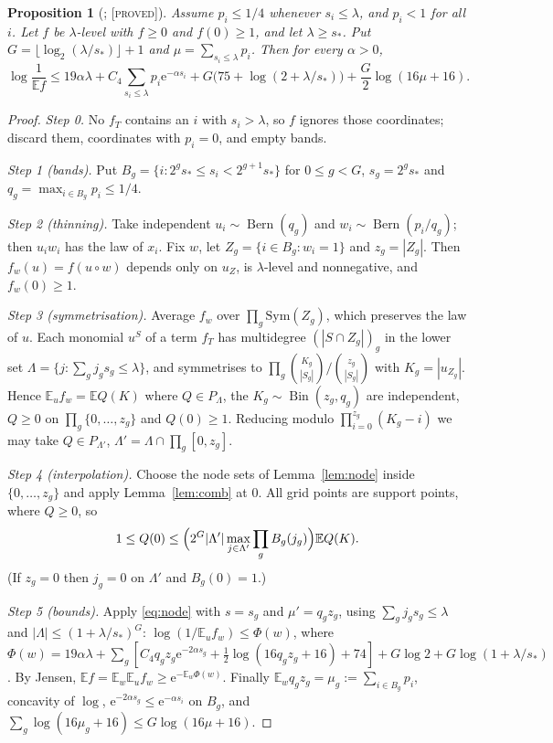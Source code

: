 \documentclass[10pt,reqno]{amsart}
\newtheorem{proposition}[theorem]{Proposition}
\theoremstyle{definition}
\theoremstyle{remark}
\newcommand{\E}{\mathbb E}
\newcommand{\Bin}{\operatorname{Bin}}
\newcommand{\Bern}{\operatorname{Bern}}
\newcommand{\e}{\mathrm e}
\newcommand{\lab}[1]{\textup{[\textsc{#1}]}}
\begin{document}
\begin{proposition}[{\cite[Prop.~2.4]{ET}}; \lab{proved}]\label{prop:boolean}
Assume $p_i\leq1/4$ whenever $s_i\leq\lambda$, and $p_i<1$ for all $i$.  Let
$f$ be $\lambda$-level with $f\geq0$ and $f(0)\geq1$, and let
$\lambda\geq s_*$.  Put $G=\lfloor\log_2(\lambda/s_*)\rfloor+1$ and
$\mu=\sum_{s_i\leq\lambda}p_i$.  Then for every $\alpha>0$,
\begin{equation}\label{eq:boolean}
 \log\frac1{\E f}\leq19\alpha\lambda+C_4\sum_{s_i\leq\lambda}p_i\e^{-\alpha s_i}
 +G\bigl(75+\log(2+\lambda/s_*)\bigr)+\frac G2\log(16\mu+16).
\end{equation}
\end{proposition}
\begin{proof}
\emph{Step 0.} No $f_T$ contains an $i$ with $s_i>\lambda$, so $f$ ignores
those coordinates; discard them, coordinates with $p_i=0$, and empty bands.

\emph{Step 1 (bands).} Put $B_g=\{i:2^gs_*\leq s_i<2^{g+1}s_*\}$ for
$0\leq g<G$, $s_g=2^gs_*$ and $q_g=\max_{i\in B_g}p_i\leq1/4$.

\emph{Step 2 (thinning).} Take independent $u_i\sim\Bern(q_g)$ and
$w_i\sim\Bern(p_i/q_g)$; then $u_iw_i$ has the law of $x_i$.  Fix $w$, let
$Z_g=\{i\in B_g:w_i=1\}$ and $z_g=|Z_g|$.  Then $f_w(u)=f(u\circ w)$
depends only on $u_Z$, is $\lambda$-level and nonnegative, and
$f_w(0)\geq1$.

\emph{Step 3 (symmetrisation).} Average $f_w$ over $\prod_g\mathrm{Sym}(Z_g)$,
which preserves the law of $u$.  Each monomial $u^S$ of a term $f_T$ has
multidegree $(|S\cap Z_g|)_g$ in the lower set
$\Lambda=\{j:\sum_gj_gs_g\leq\lambda\}$, and symmetrises to
$\prod_g\binom{K_g}{|S_g|}/\binom{z_g}{|S_g|}$ with $K_g=|u_{Z_g}|$.  Hence
$\E_uf_w=\E Q(K)$ where $Q\in P_\Lambda$, the $K_g\sim\Bin(z_g,q_g)$ are
independent, $Q\geq0$ on $\prod_g\{0,\dots,z_g\}$ and $Q(0)\geq1$.  Reducing
modulo $\prod_{i=0}^{z_g}(K_g-i)$ we may take $Q\in P_{\Lambda'}$,
$\Lambda'=\Lambda\cap\prod_g[0,z_g]$.

\emph{Step 4 (interpolation).} Choose the node sets of Lemma~\ref{lem:node}
inside $\{0,\dots,z_g\}$ and apply Lemma~\ref{lem:comb} at $0$.  All grid
points are support points, where $Q\geq0$, so
\[
 1\leq Q(0)\leq\Bigl(2^G|\Lambda'|\max_{j\in\Lambda'}\prod_gB_g(j_g)\Bigr)\E Q(K).
\]
(If $z_g=0$ then $j_g=0$ on $\Lambda'$ and $B_g(0)=1$.)

\emph{Step 5 (bounds).} Apply \eqref{eq:node} with $s=s_g$ and
$\mu'=q_gz_g$, using $\sum_gj_gs_g\leq\lambda$ and
$|\Lambda|\leq(1+\lambda/s_*)^G$:
$\log(1/\E_uf_w)\leq\Phi(w)$, where
$\Phi(w)=19\alpha\lambda+\sum_g[C_4q_gz_g\e^{-2\alpha s_g}+\frac12\log(16q_gz_g+16)+74]
+G\log2+G\log(1+\lambda/s_*)$.  By Jensen,
$\E f=\E_w\E_uf_w\geq\e^{-\E_w\Phi(w)}$.  Finally $\E_wq_gz_g=\mu_g:=\sum_{i\in B_g}p_i$,
concavity of $\log$, $\e^{-2\alpha s_g}\leq\e^{-\alpha s_i}$ on $B_g$, and
$\sum_g\log(16\mu_g+16)\leq G\log(16\mu+16)$.
\end{proof}
\end{document}
